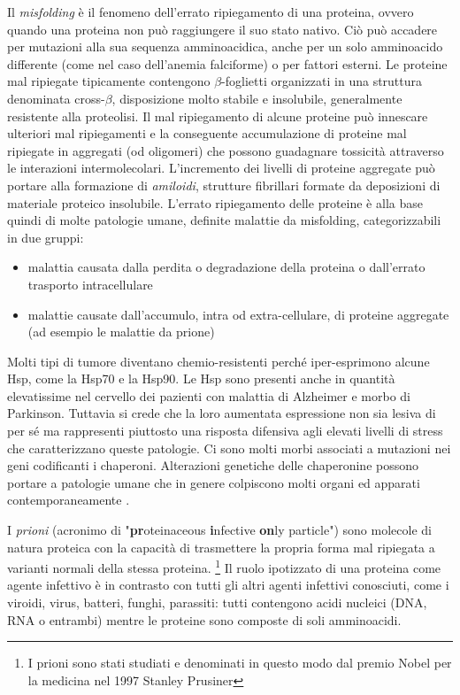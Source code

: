 Il \textit{misfolding} è il fenomeno dell'errato ripiegamento di una proteina, ovvero quando una proteina non può raggiungere il suo stato nativo. Ciò può accadere per mutazioni alla sua sequenza amminoacidica, anche per un solo amminoacido differente (come nel caso dell'anemia falciforme) o per fattori esterni. Le proteine mal ripiegate tipicamente contengono $\beta$-foglietti organizzati in una struttura denominata cross-$\beta$, disposizione molto stabile e insolubile, generalmente resistente alla proteolisi. Il mal ripiegamento di alcune proteine può innescare ulteriori mal ripiegamenti e la conseguente accumulazione di proteine mal ripiegate in aggregati (od oligomeri) che possono guadagnare tossicità attraverso le interazioni intermolecolari. L'incremento dei livelli di proteine aggregate può portare alla formazione di \textit{amiloidi}, strutture fibrillari formate da deposizioni di materiale proteico insolubile. L'errato ripiegamento delle proteine è alla base quindi di molte patologie umane, definite malattie da misfolding, categorizzabili in due gruppi:

\begin{itemize}
	\item malattia causata dalla perdita o degradazione della proteina o dall'errato trasporto intracellulare
	\item malattie causate dall'accumulo, intra od extra-cellulare, di proteine aggregate (ad esempio le malattie da prione)
\end{itemize}

Molti tipi di tumore diventano chemio-resistenti perché iper-esprimono alcune Hsp, come la Hsp70 e la Hsp90. Le Hsp sono presenti anche in quantità elevatissime nel cervello dei pazienti con malattia di Alzheimer e morbo di Parkinson. Tuttavia si crede che la loro aumentata espressione non sia lesiva di per sé ma rappresenti piuttosto una risposta difensiva agli elevati livelli di stress che caratterizzano queste patologie. Ci sono molti morbi associati a mutazioni nei geni codificanti i chaperoni. Alterazioni genetiche delle chaperonine possono portare a patologie umane che in genere colpiscono molti organi ed apparati contemporaneamente \supercite{chaperoninaWiki}. \\

\par I \textit{prioni} (acronimo di "\textbf{pr}oteinaceous \textbf{i}nfective \textbf{on}ly particle") sono molecole di natura proteica con la capacità di trasmettere la propria forma mal ripiegata a varianti normali della stessa proteina. \footnote{I prioni sono stati studiati e denominati in questo modo dal premio Nobel per la medicina nel 1997 Stanley Prusiner\supercite{prusiner1998prion}} Il ruolo ipotizzato di una proteina come agente infettivo è in contrasto con tutti gli altri agenti infettivi conosciuti, come i viroidi, virus, batteri, funghi, parassiti: tutti contengono acidi nucleici (DNA, RNA o entrambi) mentre le proteine sono composte di soli amminoacidi.

